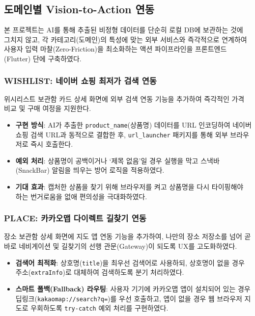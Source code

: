 \documentclass[11pt,a4paper]{article}
\begin{document}
\subsection{도메인별 Vision-to-Action 연동}

본 프로젝트는 AI를 통해 추출된 비정형 데이터를 단순히 로컬 DB에 보관하는 것에 그치지 않고, 각 카테고리(도메인)의 특성에 맞는 외부 서비스와 즉각적으로 연계하여 사용자 입력 마찰(Zero-Friction)을 최소화하는 액션 파이프라인을 프론트엔드(Flutter) 단에 구축하였다.

\subsubsection{WISHLIST: 네이버 쇼핑 최저가 검색 연동}
위시리스트 보관함 카드 상세 화면에 외부 검색 연동 기능을 추가하여 즉각적인 가격 비교 및 구매 여정을 지원한다.
\begin{itemize}
    \item \textbf{구현 방식}: AI가 추출한 \texttt{product\_name}(상품명) 데이터를 URL 인코딩하여 네이버 쇼핑 검색 URL과 동적으로 결합한 후, \texttt{url\_launcher} 패키지를 통해 외부 브라우저로 즉시 호출한다.
    \item \textbf{예외 처리}: 상품명이 공백이거나 `제목 없음'일 경우 실행을 막고 스낵바(SnackBar) 알림을 띄우는 방어 로직을 적용하였다.
    \item \textbf{기대 효과}: 캡처한 상품을 찾기 위해 브라우저를 켜고 상품명을 다시 타이핑해야 하는 번거로움을 없애 편의성을 극대화하였다.
\end{itemize}

\subsubsection{PLACE: 카카오맵 다이렉트 길찾기 연동}
장소 보관함 상세 화면에 지도 앱 연동 기능을 추가하여, 나만의 장소 저장소를 넘어 곧바로 네비게이션 및 길찾기의 선행 관문(Gateway)이 되도록 UX를 고도화하였다.
\begin{itemize}
    \item \textbf{검색어 최적화}: 상호명(\texttt{title})을 최우선 검색어로 사용하되, 상호명이 없을 경우 주소(\texttt{extraInfo})로 대체하여 검색하도록 분기 처리하였다.
    \item \textbf{스마트 폴백(Fallback) 라우팅}: 사용자 기기에 카카오맵 앱이 설치되어 있는 경우 딥링크(\texttt{kakaomap://search?q=})를 우선 호출하고, 앱이 없을 경우 웹 브라우저 지도로 우회하도록 \texttt{try-catch} 예외 처리를 구현하였다.
\end{itemize}
\end{document}
